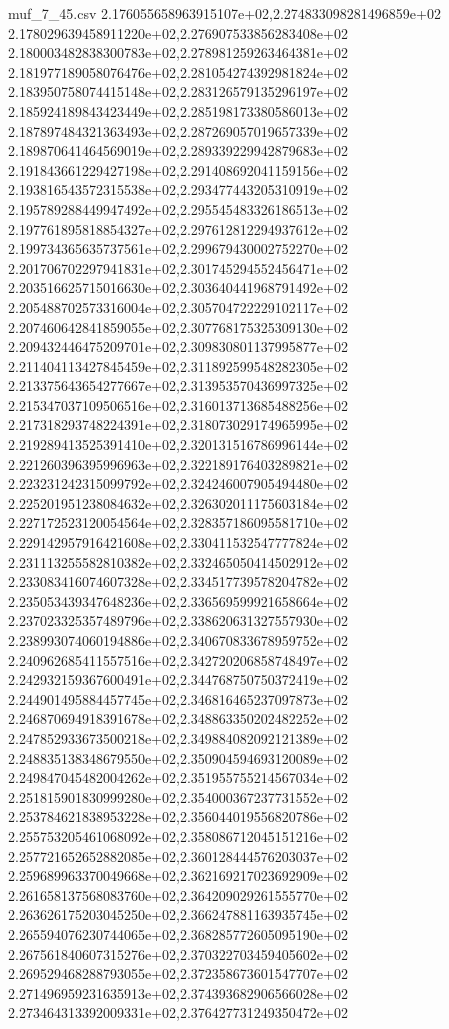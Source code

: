 \begin{filecontents*}{muf_7_45.csv}
2.176055658963915107e+02,2.274833098281496859e+02
2.178029639458911220e+02,2.276907533856283408e+02
2.180003482838300783e+02,2.278981259263464381e+02
2.181977189058076476e+02,2.281054274392981824e+02
2.183950758074415148e+02,2.283126579135296197e+02
2.185924189843423449e+02,2.285198173380586013e+02
2.187897484321363493e+02,2.287269057019657339e+02
2.189870641464569019e+02,2.289339229942879683e+02
2.191843661229427198e+02,2.291408692041159156e+02
2.193816543572315538e+02,2.293477443205310919e+02
2.195789288449947492e+02,2.295545483326186513e+02
2.197761895818854327e+02,2.297612812294937612e+02
2.199734365635737561e+02,2.299679430002752270e+02
2.201706702297941831e+02,2.301745294552456471e+02
2.203516625715016630e+02,2.303640441968791492e+02
2.205488702573316004e+02,2.305704722229102117e+02
2.207460642841859055e+02,2.307768175325309130e+02
2.209432446475209701e+02,2.309830801137995877e+02
2.211404113427845459e+02,2.311892599548282305e+02
2.213375643654277667e+02,2.313953570436997325e+02
2.215347037109506516e+02,2.316013713685488256e+02
2.217318293748224391e+02,2.318073029174965995e+02
2.219289413525391410e+02,2.320131516786996144e+02
2.221260396395996963e+02,2.322189176403289821e+02
2.223231242315099792e+02,2.324246007905494480e+02
2.225201951238084632e+02,2.326302011175603184e+02
2.227172523120054564e+02,2.328357186095581710e+02
2.229142957916421608e+02,2.330411532547777824e+02
2.231113255582810382e+02,2.332465050414502912e+02
2.233083416074607328e+02,2.334517739578204782e+02
2.235053439347648236e+02,2.336569599921658664e+02
2.237023325357489796e+02,2.338620631327557930e+02
2.238993074060194886e+02,2.340670833678959752e+02
2.240962685411557516e+02,2.342720206858748497e+02
2.242932159367600491e+02,2.344768750750372419e+02
2.244901495884457745e+02,2.346816465237097873e+02
2.246870694918391678e+02,2.348863350202482252e+02
2.247852933673500218e+02,2.349884082092121389e+02
2.248835138348679550e+02,2.350904594693120089e+02
2.249847045482004262e+02,2.351955755214567034e+02
2.251815901830999280e+02,2.354000367237731552e+02
2.253784621838953228e+02,2.356044019556820786e+02
2.255753205461068092e+02,2.358086712045151216e+02
2.257721652652882085e+02,2.360128444576203037e+02
2.259689963370049668e+02,2.362169217023692909e+02
2.261658137568083760e+02,2.364209029261555770e+02
2.263626175203045250e+02,2.366247881163935745e+02
2.265594076230744065e+02,2.368285772605095190e+02
2.267561840607315276e+02,2.370322703459405602e+02
2.269529468288793055e+02,2.372358673601547707e+02
2.271496959231635913e+02,2.374393682906566028e+02
2.273464313392009331e+02,2.376427731249350472e+02

\end{filecontents*}
